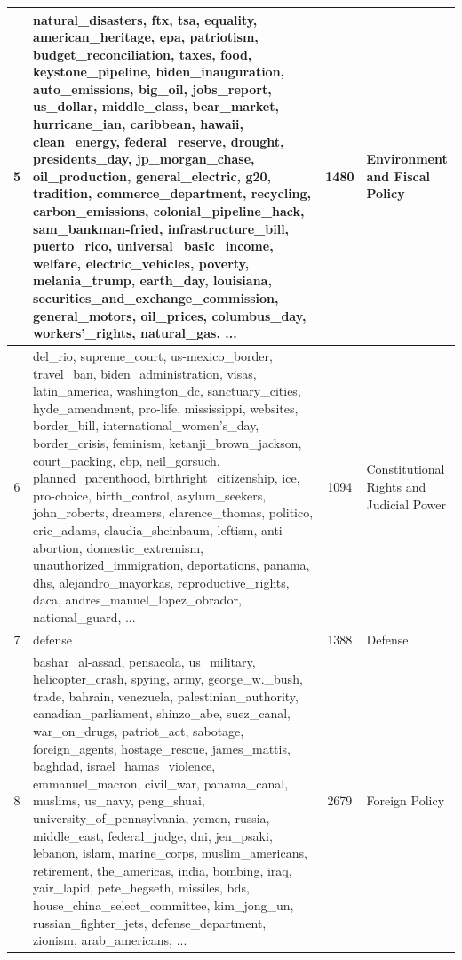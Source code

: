 \begin{tiny}
\begin{longtable}{c p{} c p{}}
5 & natural\_disasters, ftx, tsa, equality, american\_heritage, epa, patriotism, budget\_reconciliation, taxes, food, keystone\_pipeline, biden\_inauguration, auto\_emissions, big\_oil, jobs\_report, us\_dollar, middle\_class, bear\_market, hurricane\_ian, caribbean, hawaii, clean\_energy, federal\_reserve, drought, presidents\_day, jp\_morgan\_chase, oil\_production, general\_electric, g20, tradition, commerce\_department, recycling, carbon\_emissions, colonial\_pipeline\_hack, sam\_bankman-fried, infrastructure\_bill, puerto\_rico, universal\_basic\_income, welfare, electric\_vehicles, poverty, melania\_trump, earth\_day, louisiana, securities\_and\_exchange\_commission, general\_motors, oil\_prices, columbus\_day, workers'\_rights, natural\_gas, ... & 1480 & Environment and Fiscal Policy \\
\midrule

6 & del\_rio, supreme\_court, us-mexico\_border, travel\_ban, biden\_administration, visas, latin\_america, washington\_dc, sanctuary\_cities, hyde\_amendment, pro-life, mississippi, websites, border\_bill, international\_women's\_day, border\_crisis, feminism, ketanji\_brown\_jackson, court\_packing, cbp, neil\_gorsuch, planned\_parenthood, birthright\_citizenship, ice, pro-choice, birth\_control, asylum\_seekers, john\_roberts, dreamers, clarence\_thomas, politico, eric\_adams, claudia\_sheinbaum, leftism, anti-abortion, domestic\_extremism, unauthorized\_immigration, deportations, panama, dhs, alejandro\_mayorkas, reproductive\_rights, daca, andres\_manuel\_lopez\_obrador, national\_guard, ... & 1094 & Constitutional Rights and Judicial Power \\
\midrule

7 & defense & 1388 & Defense \\
\midrule

8 & bashar\_al-assad, pensacola, us\_military, helicopter\_crash, spying, army, george\_w.\_bush, trade, bahrain, venezuela, palestinian\_authority, canadian\_parliament, shinzo\_abe, suez\_canal, war\_on\_drugs, patriot\_act, sabotage, foreign\_agents, hostage\_rescue, james\_mattis, baghdad, israel\_hamas\_violence, emmanuel\_macron, civil\_war, panama\_canal, muslims, us\_navy, peng\_shuai, university\_of\_pennsylvania, yemen, russia, middle\_east, federal\_judge, dni, jen\_psaki, lebanon, islam, marine\_corps, muslim\_americans, retirement, the\_americas, india, bombing, iraq, yair\_lapid, pete\_hegseth, missiles, bds, house\_china\_select\_committee, kim\_jong\_un, russian\_fighter\_jets, defense\_department, zionism, arab\_americans, ... & 2679 & Foreign Policy \\
\midrule


\end{longtable}
\end{tiny}
